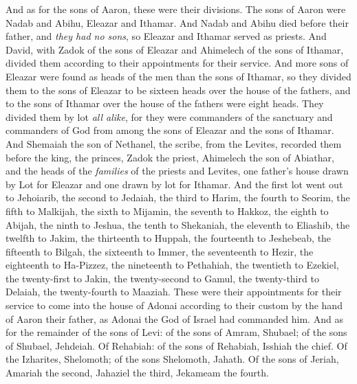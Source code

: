 \begin{biblechapter} %
 And as for the sons of Aaron, these were their divisions. The sons of Aaron were Nadab and Abihu, Eleazar and Ithamar.
\verse And Nadab and Abihu died before their father, and \textit{they had no sons}, so Eleazar and Ithamar served as priests.
\verse And David, with Zadok of the sons of Eleazar and Ahimelech of the sons of Ithamar, divided them according to their appointments for their service.
\verse And more sons of Eleazar were found as heads of the men than the sons of Ithamar, so they divided them to the sons of Eleazar to be sixteen heads over the house of the fathers, and to the sons of Ithamar over the house of the fathers were eight heads.
\verse They divided them by lot \textit{all alike}, for they were commanders of the sanctuary and commanders of God from among the sons of Eleazar and the sons of Ithamar.
\verse And Shemaiah the son of Nethanel, the scribe, from the Levites, recorded them before the king, the princes, Zadok the priest, Ahimelech the son of Abiathar, and the heads of the \textit{families} of the priests and Levites, one father’s house drawn by Lot for Eleazar and one drawn by lot for Ithamar.
\verse And the first lot went out to Jehoiarib, the second to Jedaiah,
\verse the third to Harim, the fourth to Seorim,
\verse the fifth to Malkijah, the sixth to Mijamin,
\verse the seventh to Hakkoz, the eighth to Abijah,
\verse the ninth to Jeshua, the tenth to Shekaniah,
\verse the eleventh to Eliashib, the twelfth to Jakim,
\verse the thirteenth to Huppah, the fourteenth to Jeshebeab,
\verse the fifteenth to Bilgah, the sixteenth to Immer,
\verse the seventeenth to Hezir, the eighteenth to Ha-Pizzez,
\verse the nineteenth to Pethahiah, the twentieth to Ezekiel,
\verse the twenty-first to Jakin, the twenty-second to Gamul,
\verse the twenty-third to Delaiah, the twenty-fourth to Maaziah.
\verse These were their appointments for their service to come into the house of Adonai according to their custom by the hand of Aaron their father, as Adonai the God of Israel had commanded him.
\verse And as for the remainder of the sons of Levi: of the sons of Amram, Shubael; of the sons of Shubael, Jehdeiah.
\verse Of Rehabiah: of the sons of Rehabiah, Isshiah the chief.
\verse Of the Izharites, Shelomoth; of the sons Shelomoth, Jahath.
\verse Of the sons of Jeriah, Amariah the second, Jahaziel the third, Jekameam the fourth.

\end{biblechapter}
